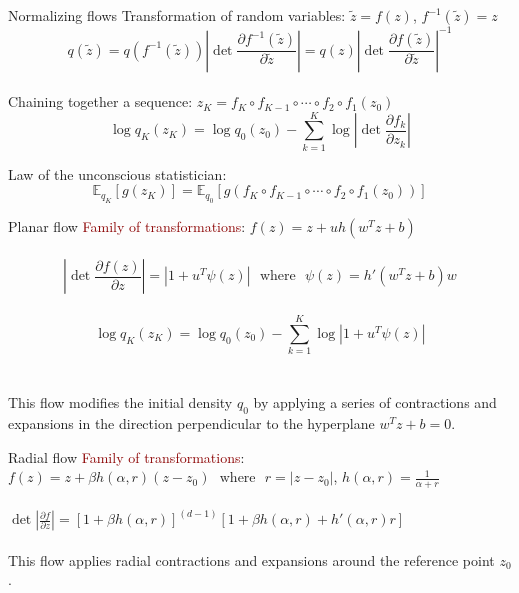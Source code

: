 \documentclass[unicode,11pt]{beamer}
\begin{document}
\begin{frame}[fragile]{Normalizing flows}
  Transformation of random variables: $\tilde{z} = f(z)$, $f^{-1}(\tilde{z}) = z$\\
  $$
  q(\tilde{z})
  = q(f^{-1}(\tilde{z})) \left\vert \det \frac{\partial f^{-1}(\tilde{z})}{\partial \tilde{z}} \right\vert
  = q(z) \left\vert \det \frac{\partial f(\tilde{z})}{\partial \tilde{z}} \right\vert^{-1}
  $$ \\
  Chaining together a sequence: $z_K = f_K \circ f_{K−1} \circ \cdots \circ f_2 \circ f_1(z_0)$\\
  $$\log q_K(z_K) = \log q_0(z_0) − \sum_{k=1}^K \log \left\vert \det \frac{\partial f_k}{\partial z_k} \right\vert $$

  Law of the unconscious statistician:\\
  $$\mathbb{E}_{q_K} \left[g(z_K)\right] = \mathbb{E}_{q_0} \left[ g(f_K \circ f_{K−1} \circ \cdots \circ f_2
  \circ f_1(z_0)) \right] $$
\end{frame}

\begin{frame}[fragile]{Planar flow}
  \textcolor{darkred}{Family of transformations}: $f(z) = z + uh\left( w^T z + b \right)$\\
  ~\\
  $$\left\vert \det \frac{\partial f(z)}{\partial z} \right\vert = \left\vert 1 + u^T \psi(z)
  \right\vert ~~~\text{where}~~~ \psi(z) = h'(w^Tz + b)w$$ \\
  $$\log q_K(z_K) = \log q_0(z_0) − \sum_{k=1}^K \log \left\vert 1 + u^T \psi(z) \right\vert $$\\
  ~\\
  This flow modifies the initial density $q_0$ by applying a series of contractions and expansions in
  the direction perpendicular to the hyperplane $w^Tz+b = 0$.

\end{frame}

\begin{frame}[fragile]{Radial flow}
  \textcolor{darkred}{Family of transformations}: \\
  $f(z) = z + \beta h(\alpha, r)(z-z_0) ~~~\text{where}~~~ r = \vert z-z_0 \vert$,
  $h(\alpha, r) = \frac{1}{\alpha + r}$\\
  ~\\
  $\det \left\vert \frac{\partial f}{\partial z} \right\vert = [1 + \beta h(\alpha, r)]^{(d-1)}
  [1 + \beta h(\alpha, r) + h'(\alpha, r) r]$\\
  ~\\
  This flow applies radial contractions and expansions around the reference
  point $z_0$.

\end{frame}
\end{document}
